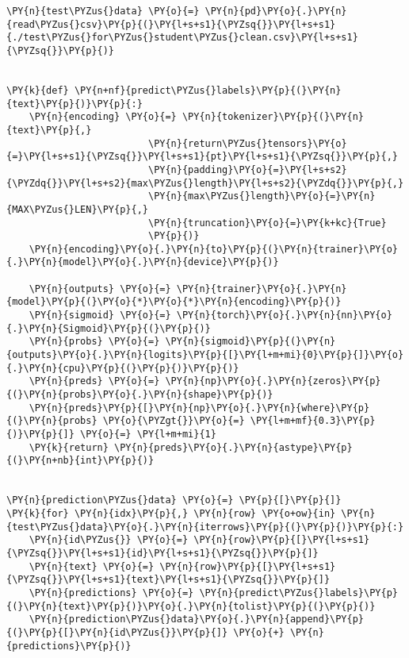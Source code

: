 \documentclass[../main.tex]{subfiles}
\begin{document}
\newpage
    \begin{tcolorbox}[breakable, size=fbox, boxrule=1pt, pad at break*=1mm,colback=cellbackground, colframe=cellborder]
\begin{Verbatim}[commandchars=\\\{\}]
\PY{n}{test\PYZus{}data} \PY{o}{=} \PY{n}{pd}\PY{o}{.}\PY{n}{read\PYZus{}csv}\PY{p}{(}\PY{l+s+s1}{\PYZsq{}}\PY{l+s+s1}{./test\PYZus{}for\PYZus{}student\PYZus{}clean.csv}\PY{l+s+s1}{\PYZsq{}}\PY{p}{)}


\PY{k}{def} \PY{n+nf}{predict\PYZus{}labels}\PY{p}{(}\PY{n}{text}\PY{p}{)}\PY{p}{:}
    \PY{n}{encoding} \PY{o}{=} \PY{n}{tokenizer}\PY{p}{(}\PY{n}{text}\PY{p}{,}
                         \PY{n}{return\PYZus{}tensors}\PY{o}{=}\PY{l+s+s1}{\PYZsq{}}\PY{l+s+s1}{pt}\PY{l+s+s1}{\PYZsq{}}\PY{p}{,}
                         \PY{n}{padding}\PY{o}{=}\PY{l+s+s2}{\PYZdq{}}\PY{l+s+s2}{max\PYZus{}length}\PY{l+s+s2}{\PYZdq{}}\PY{p}{,}
                         \PY{n}{max\PYZus{}length}\PY{o}{=}\PY{n}{MAX\PYZus{}LEN}\PY{p}{,}
                         \PY{n}{truncation}\PY{o}{=}\PY{k+kc}{True}
                         \PY{p}{)}
    \PY{n}{encoding}\PY{o}{.}\PY{n}{to}\PY{p}{(}\PY{n}{trainer}\PY{o}{.}\PY{n}{model}\PY{o}{.}\PY{n}{device}\PY{p}{)}

    \PY{n}{outputs} \PY{o}{=} \PY{n}{trainer}\PY{o}{.}\PY{n}{model}\PY{p}{(}\PY{o}{*}\PY{o}{*}\PY{n}{encoding}\PY{p}{)}
    \PY{n}{sigmoid} \PY{o}{=} \PY{n}{torch}\PY{o}{.}\PY{n}{nn}\PY{o}{.}\PY{n}{Sigmoid}\PY{p}{(}\PY{p}{)}
    \PY{n}{probs} \PY{o}{=} \PY{n}{sigmoid}\PY{p}{(}\PY{n}{outputs}\PY{o}{.}\PY{n}{logits}\PY{p}{[}\PY{l+m+mi}{0}\PY{p}{]}\PY{o}{.}\PY{n}{cpu}\PY{p}{(}\PY{p}{)}\PY{p}{)}
    \PY{n}{preds} \PY{o}{=} \PY{n}{np}\PY{o}{.}\PY{n}{zeros}\PY{p}{(}\PY{n}{probs}\PY{o}{.}\PY{n}{shape}\PY{p}{)}
    \PY{n}{preds}\PY{p}{[}\PY{n}{np}\PY{o}{.}\PY{n}{where}\PY{p}{(}\PY{n}{probs} \PY{o}{\PYZgt{}}\PY{o}{=} \PY{l+m+mf}{0.3}\PY{p}{)}\PY{p}{]} \PY{o}{=} \PY{l+m+mi}{1}
    \PY{k}{return} \PY{n}{preds}\PY{o}{.}\PY{n}{astype}\PY{p}{(}\PY{n+nb}{int}\PY{p}{)}


\PY{n}{prediction\PYZus{}data} \PY{o}{=} \PY{p}{[}\PY{p}{]}
\PY{k}{for} \PY{n}{idx}\PY{p}{,} \PY{n}{row} \PY{o+ow}{in} \PY{n}{test\PYZus{}data}\PY{o}{.}\PY{n}{iterrows}\PY{p}{(}\PY{p}{)}\PY{p}{:}
    \PY{n}{id\PYZus{}} \PY{o}{=} \PY{n}{row}\PY{p}{[}\PY{l+s+s1}{\PYZsq{}}\PY{l+s+s1}{id}\PY{l+s+s1}{\PYZsq{}}\PY{p}{]}
    \PY{n}{text} \PY{o}{=} \PY{n}{row}\PY{p}{[}\PY{l+s+s1}{\PYZsq{}}\PY{l+s+s1}{text}\PY{l+s+s1}{\PYZsq{}}\PY{p}{]}
    \PY{n}{predictions} \PY{o}{=} \PY{n}{predict\PYZus{}labels}\PY{p}{(}\PY{n}{text}\PY{p}{)}\PY{o}{.}\PY{n}{tolist}\PY{p}{(}\PY{p}{)}
    \PY{n}{prediction\PYZus{}data}\PY{o}{.}\PY{n}{append}\PY{p}{(}\PY{p}{[}\PY{n}{id\PYZus{}}\PY{p}{]} \PY{o}{+} \PY{n}{predictions}\PY{p}{)}


\end{Verbatim}
\end{tcolorbox}
\end{document}
